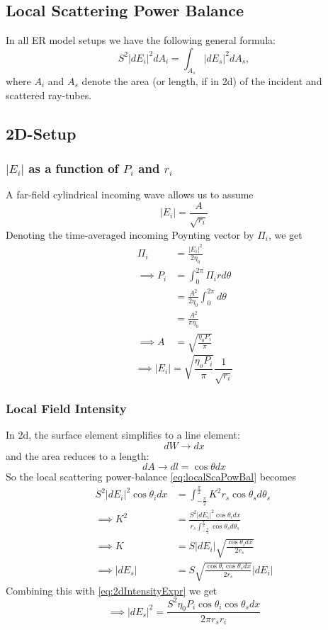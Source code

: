 \documentclass{article}
\begin{document}
\subsection*{Local Scattering Power Balance}
In all ER model setups we have the following general formula:
\begin{equation}
   S^2 |dE_i|^2 d A_i = \int_{A_s} |dE_s|^2 d A_s,
   \label{eq:localScaPowBal}
\end{equation}
where $A_i$ and $A_s$ denote the area (or length, if in 2d) of the incident and
scattered ray-tubes.
\subsection*{2D-Setup}

\subsubsection*{$|E_i|$ as a function of $P_i$ and $r_i$}
A far-field cylindrical incoming wave allows us to assume 
\begin{equation}
   |E_i| = \frac{A}{\sqrt{r_i}}
   \label{eq:farField2d}
\end{equation}
Denoting the time-averaged incoming Poynting vector by $\Pi_i$, we get 
\begin{align*}
   \Pi_i &= \frac{|E_i|^2}{2 \eta_0} \\
   \implies P_i &= \int_{0}^{2\pi} \Pi_i r d \theta \\ 
   &= \frac{A^2}{2 \eta_0} \int_0^{2 \pi} d \theta \\ 
   &= \frac{A^2}{\pi \eta_0} \\
   \implies A &= \sqrt{\frac{\eta_0 P_i}{\pi}}
\end{align*}
\begin{equation}
   \implies |E_i| = \sqrt{ \frac{\eta_o P_i}{\pi} } \frac{1}{\sqrt{r_i}}
   \label{eq:2dIntensityExpr}
\end{equation}
\subsubsection*{Local Field Intensity}
In 2d, the surface element simplifies to a line element:
\[ dW \to dx \]
and the area reduces to a length:
\[ d A \to d l = \cos \theta dx \]
So the local scattering power-balance \eqref{eq:localScaPowBal} becomes
\begin{align*}
   S^2|dE_i|^2 \cos \theta_i dx  &= \int_{-\frac{\pi}{2}}^{\frac{\pi}{2}} K^2 r_s \cos
   \theta_s d \theta_s  \\
   \implies K^2 &= \frac{S^2|dE_i|^2 \cos \theta_i dx}{r_s
   \int_{-\frac{\pi}{2}}^{\frac{\pi}{2}} \cos \theta_s d \theta_s } \\
   \implies K &= S |dE_i| \sqrt{ \frac{\cos \theta_i dx}{2r_s} } \\
   \implies |dE_s| &= S \sqrt{ \frac{\cos \theta_i \cos \theta_s dx}{2r_s} } |dE_i|
\end{align*}
Combining this with \eqref{eq:2dIntensityExpr} we get
\begin{equation}
   \implies |dE_s|^2 = \frac{ S^2 \eta_0 P_i \cos \theta_i \cos \theta_s dx}{2
   \pi r_s r_i }
   \label{eq:localScaPow2d}
\end{equation}
\end{document}
